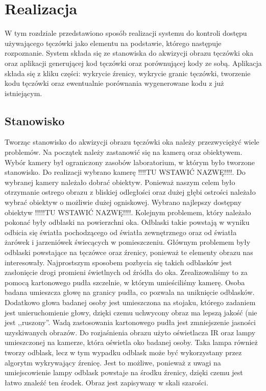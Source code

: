 \chapter{Realizacja}
\label{cha:realizacja}
W tym rozdziale przedstawiono sposób realizacji systemu do kontroli dostępu używającego tęczówki jako elementu na podstawie, którego następuje rozpoznanie. System składa się ze stanowiska do akwizycji obrazu tęczówki oka oraz aplikacji generującej kod tęczówki oraz porównującej kody ze sobą. Aplikacja składa się z kliku części: wykrycie źrenicy, wykrycie granic tęczówki, tworzenie kodu tęczówki oraz ewentualnie porównania wygenerowane kodu z już istniejącym.

\section{Stanowisko}
\label{sec:stanowisko}
Tworząc stanowisko do akwizycji obrazu tęczówki oka należy przezwyciężyć wiele problemów. Na początek należy zastanowić się na kamerą oraz obiektywem. Wybór kamery był ograniczony zasobów laboratorium, w którym było tworzone stanowisko. Do realizacji wybrano kamerę !!!!TU WSTAWIĆ NAZWĘ!!!!. Do wybranej kamery należało dobrać obiektyw. Ponieważ naszym celem było otrzymanie ostrego obrazu z bliskiej odległości oraz dużej głębi ostrości należało wybrać obiektyw o możliwie dużej ogniskowej. Wybrano najlepszy dostępny obiektyw !!!!!TU WSTAWIĆ NAZWĘ!!!!. Kolejnym problemem, który należało pokonać były odblaski na powierzchni oka. Odblaski takie powstają w wyniku odbicia się światła pochodzącego od światła zewnętrznego oraz od światła żarówek i jarzeniówek świecących w pomieszczeniu. Głównym problemem były odblaski powstające na tęczówce oraz źrenicy, ponieważ te elementy obrazu nas interesowały. Najprostszym sposobem pozbycia się takich odblasków jest zasłonięcie drogi promieni świetlnych od źródła do oka. Zrealizowaliśmy to za pomocą kartonowego pudła szczelnie, w którym umieściliśmy kamerę. Osoba badana umieszcza głowę na granicy pudła, co pozwala na uniknięcie odblasków. Dodatkowo głowa badanej osoby jest umieszczona na stojaku, którego zadaniem jest unieruchomienie głowy, dzięki czemu uchwycony obraz ma lepszą jakość (nie jest ,,ruszony''. Wadą zastosowania kartonowego pudła jest zmniejszenie jasności uzyskiwanych obrazów. Do rozjaśnienia obrazu użyto oświetlacza IR oraz lampy umieszczonej na kamerze, która oświetla oko badanej osoby. Taka lampa również tworzy odblask, lecz w tym wypadku odblask może być wykorzystany przez algorytm wykrywający źrenicę. Jest to możliwe, ponieważ z uwagi na umiejscowienie lampy odblask powstaje na środku źrenicy, dzięki czemu jest łatwo znaleźć ten środek. Obraz jest zapisywany w skali szarości.

